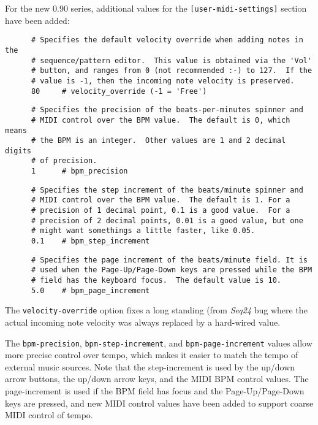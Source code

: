    For the new 0.90 series, additional values for the
   \texttt{[user-midi-settings]} section have been added:

   \begin{verbatim}
      # Specifies the default velocity override when adding notes in the
      # sequence/pattern editor.  This value is obtained via the 'Vol'
      # button, and ranges from 0 (not recommended :-) to 127.  If the
      # value is -1, then the incoming note velocity is preserved.
      80     # velocity_override (-1 = 'Free')
   \end{verbatim}

   \begin{verbatim}
      # Specifies the precision of the beats-per-minutes spinner and
      # MIDI control over the BPM value.  The default is 0, which means
      # the BPM is an integer.  Other values are 1 and 2 decimal digits
      # of precision.
      1      # bpm_precision
   \end{verbatim}

   \begin{verbatim}
      # Specifies the step increment of the beats/minute spinner and
      # MIDI control over the BPM value.  The default is 1. For a
      # precision of 1 decimal point, 0.1 is a good value.  For a
      # precision of 2 decimal points, 0.01 is a good value, but one
      # might want somethings a little faster, like 0.05.
      0.1    # bpm_step_increment
   \end{verbatim}

   \begin{verbatim}
      # Specifies the page increment of the beats/minute field. It is
      # used when the Page-Up/Page-Down keys are pressed while the BPM
      # field has the keyboard focus.  The default value is 10.
      5.0    # bpm_page_increment
   \end{verbatim}

      The \texttt{velocity-override} option fixes a long standing (from
      \textsl{Seq24} bug where the actual incoming note velocity was always
      replaced by a hard-wired value.

      The \texttt{bpm-precision}, \texttt{bpm-step-increment}, and
      \texttt{bpm-page-increment} values allow more precise control over tempo,
      which makes it easier to match the tempo of external music sources.  Note
      that the step-increment is used by the up/down arrow buttons, the up/down
      arrow keys, and the MIDI BPM control values.  The page-increment is used
      if the BPM field has focus and the Page-Up/Page-Down keys are pressed,
      and new MIDI control values have been added to support coarse MIDI
      control of tempo.

